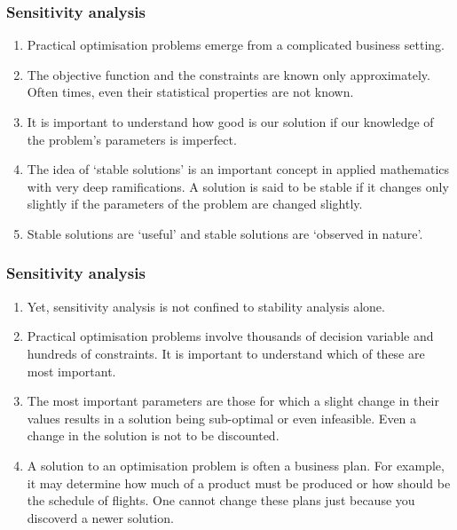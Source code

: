 \documentclass{beamer}
\begin{document}
\begin{frame}
\frametitle{Sensitivity analysis}
\begin{enumerate}
\item Practical optimisation problems emerge from a complicated business setting.
\item The objective function and the constraints are known only approximately.
Often times, even their statistical properties are not known.
\item It is important to understand how good is our solution if our knowledge of
the problem's parameters is imperfect.
\item The idea of `stable solutions' is an important concept in applied 
mathematics with very deep ramifications. A solution is said to be stable if it
changes only slightly if the parameters of the problem are changed slightly. 
\item Stable solutions are `useful' and stable solutions are `observed in 
nature'.
\end{enumerate}
\end{frame}

\begin{frame}
\frametitle{Sensitivity analysis}
\begin{enumerate}
\item Yet, sensitivity analysis is not confined to stability analysis alone.
\item Practical optimisation problems involve thousands of decision variable and
hundreds of constraints. It is important to understand which of these are most
important.
\item The most important parameters are those for which a slight change in their
values results in a solution being sub-optimal or even infeasible. Even a change 
in the solution is not to be discounted.
\item A solution to an optimisation problem is often a business plan. For 
example, it may determine how much of a product must be produced or how should 
be the schedule of flights. One cannot change these plans just because you
discoverd a newer solution.
\end{enumerate}
\end{frame}
\end{document}
